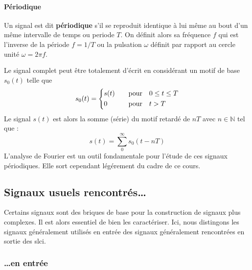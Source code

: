 \paragraph{Périodique}
                                                                                                                              
Un signal est dit \textbf{périodique} s'il se reproduit identique à lui
même au bout d'un même intervalle de temps ou periode $T$. On définit alors sa fréquence $f$
qui est l'inverse de la période $f=1/T$ ou la pulsation $\omega$ définit par rapport au cercle unité
$\omega=2\pi f$.
{
\begin{figure}[!htb]
\centering
{}

\end{figure}
\setlength\intextsep{0pt}
}
                                                                                                                              
Le signal complet peut être totalement d'écrit en considérant un motif de base $s_0(t)$ telle que
\begin{align*}
s_0(t) =
\begin{dcases}
    s(t)&\quad\text{pour}\quad 0\le t\le T   \\
    0&\quad\text{pour}\quad t>T
\end{dcases}
\end{align*}
Le signal $s(t)$ est alors la somme (série) du motif retardé de $nT$ 
avec $n\in\mathbb{N}$ tel que :
$$
s(t)=\sum_0^\infty s_0(t-nT)
$$
L'analyse de Fourier est un outil fondamentale pour l'étude 
de ces signaux périodiques. Elle sort cependant légérement du cadre de ce cours.

\subsection{Signaux usuels rencontrés\ldots\label{sec-signaux_usuels}}

Certains signaux sont des briques de base pour la construction de
signaux plus complexes. Il est alors essentiel de bien les caractériser.
Ici, nous distingons les signaux généralement utilisés en 
entrée des signaux généralement rencontrées en sortie des \gls{slci}.

\subsubsection{\ldots en entrée}

